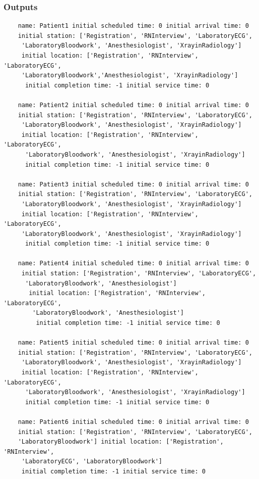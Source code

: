 \documentclass[12pt]{article}
\begin{document}
	\subsubsection{Outputs}
	\begin{verbatim}
	name: Patient1 initial scheduled time: 0 initial arrival time: 0 
	initial station: ['Registration', 'RNInterview', 'LaboratoryECG',
	 'LaboratoryBloodwork', 'Anesthesiologist', 'XrayinRadiology'] 
	 initial location: ['Registration', 'RNInterview', 'LaboratoryECG', 
	 'LaboratoryBloodwork','Anesthesiologist', 'XrayinRadiology']
	  initial completion time: -1 initial service time: 0
	
	name: Patient2 initial scheduled time: 0 initial arrival time: 0 
	initial station: ['Registration', 'RNInterview', 'LaboratoryECG',
	 'LaboratoryBloodwork', 'Anesthesiologist', 'XrayinRadiology'] 
	 initial location: ['Registration', 'RNInterview', 'LaboratoryECG',
	  'LaboratoryBloodwork', 'Anesthesiologist', 'XrayinRadiology'] 
	  initial completion time: -1 initial service time: 0
	
	name: Patient3 initial scheduled time: 0 initial arrival time: 0 
	initial station: ['Registration', 'RNInterview', 'LaboratoryECG',
	 'LaboratoryBloodwork', 'Anesthesiologist', 'XrayinRadiology'] 
	 initial location: ['Registration', 'RNInterview', 'LaboratoryECG', 
	 'LaboratoryBloodwork', 'Anesthesiologist', 'XrayinRadiology']
	  initial completion time: -1 initial service time: 0

	name: Patient4 initial scheduled time: 0 initial arrival time: 0
	 initial station: ['Registration', 'RNInterview', 'LaboratoryECG',
	  'LaboratoryBloodwork', 'Anesthesiologist']
	   initial location: ['Registration', 'RNInterview', 'LaboratoryECG',
	    'LaboratoryBloodwork', 'Anesthesiologist']
	     initial completion time: -1 initial service time: 0

	name: Patient5 initial scheduled time: 0 initial arrival time: 0 
	initial station: ['Registration', 'RNInterview', 'LaboratoryECG',
	 'LaboratoryBloodwork', 'Anesthesiologist', 'XrayinRadiology'] 
	 initial location: ['Registration', 'RNInterview', 'LaboratoryECG',
	  'LaboratoryBloodwork', 'Anesthesiologist', 'XrayinRadiology'] 
	  initial completion time: -1 initial service time: 0

	name: Patient6 initial scheduled time: 0 initial arrival time: 0 
	initial station: ['Registration', 'RNInterview', 'LaboratoryECG', 
	'LaboratoryBloodwork'] initial location: ['Registration', 'RNInterview',
	 'LaboratoryECG', 'LaboratoryBloodwork'] 
	 initial completion time: -1 initial service time: 0
	
	\end{verbatim}
	
\end{document}
